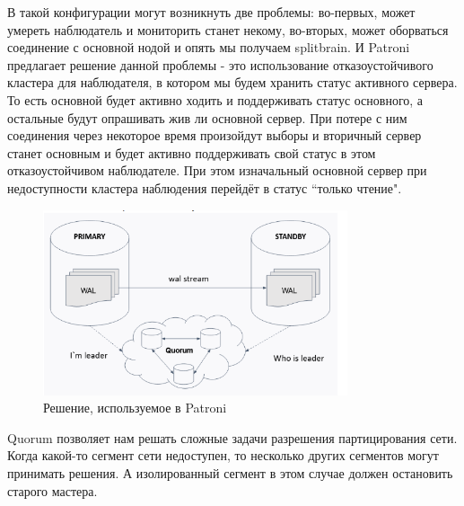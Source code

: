 В такой конфигурации могут возникнуть две проблемы: во-первых, может умереть наблюдатель и мониторить станет некому, во-вторых, может оборваться соединение с основной нодой и опять мы получаем splitbrain. 
И Patroni предлагает решение данной проблемы - это использование отказоустойчивого кластера для наблюдателя, в котором мы будем хранить статус активного сервера. То есть основной будет активно ходить и поддерживать статус основного, а остальные будут опрашивать жив ли основной сервер. При потере с ним соединения через некоторое время произойдут выборы и вторичный сервер станет основным и будет активно поддерживать свой статус в этом отказоустойчивом наблюдателе. При этом изначальный основной сервер при недоступности кластера наблюдения перейдёт в статус “только чтение".

\begin{figure}[h]
    \centering
    \includegraphics[width=0.8\textwidth]{assets/Patroni5.png}
    \caption{Решение, используемое в Patroni}
    \label{fig:mesh1}
\end{figure}

Quorum позволяет нам решать сложные задачи разрешения партицирования сети. Когда какой-то сегмент сети недоступен, то несколько других сегментов могут принимать решения. А изолированный сегмент в этом случае должен остановить старого мастера. 